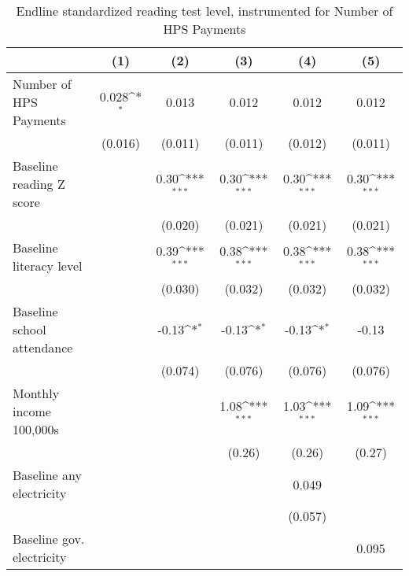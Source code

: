 \begin{table}[htbp]\centering
\def\sym#1{\ifmmode^{#1}\else\(^{#1}\)\fi}
\caption{Endline standardized reading test level, instrumented for Number of HPS Payments}
\begin{tabular*}{1\hsize}{@{\hskip\tabcolsep\extracolsep\fill}l*{5}{c}}
\toprule
                &\multicolumn{1}{c}{(1)}         &\multicolumn{1}{c}{(2)}         &\multicolumn{1}{c}{(3)}         &\multicolumn{1}{c}{(4)}         &\multicolumn{1}{c}{(5)}         \\
\midrule
Number of HPS Payments&    0.028\sym{*}  &    0.013         &    0.012         &    0.012         &    0.012         \\
                &  (0.016)         &  (0.011)         &  (0.011)         &  (0.012)         &  (0.011)         \\
Baseline reading Z score&                  &     0.30\sym{***}&     0.30\sym{***}&     0.30\sym{***}&     0.30\sym{***}\\
                &                  &  (0.020)         &  (0.021)         &  (0.021)         &  (0.021)         \\
Baseline literacy level&                  &     0.39\sym{***}&     0.38\sym{***}&     0.38\sym{***}&     0.38\sym{***}\\
                &                  &  (0.030)         &  (0.032)         &  (0.032)         &  (0.032)         \\
Baseline school attendance&                  &    -0.13\sym{*}  &    -0.13\sym{*}  &    -0.13\sym{*}  &    -0.13         \\
                &                  &  (0.074)         &  (0.076)         &  (0.076)         &  (0.076)         \\
Monthly income 100,000s&                  &                  &     1.08\sym{***}&     1.03\sym{***}&     1.09\sym{***}\\
                &                  &                  &   (0.26)         &   (0.26)         &   (0.27)         \\
Baseline any electricity&                  &                  &                  &    0.049         &                  \\
                &                  &                  &                  &  (0.057)         &                  \\
Baseline gov. electricity&                  &                  &                  &                  &    0.095         \\

\end{tabular*}
\end{table}
